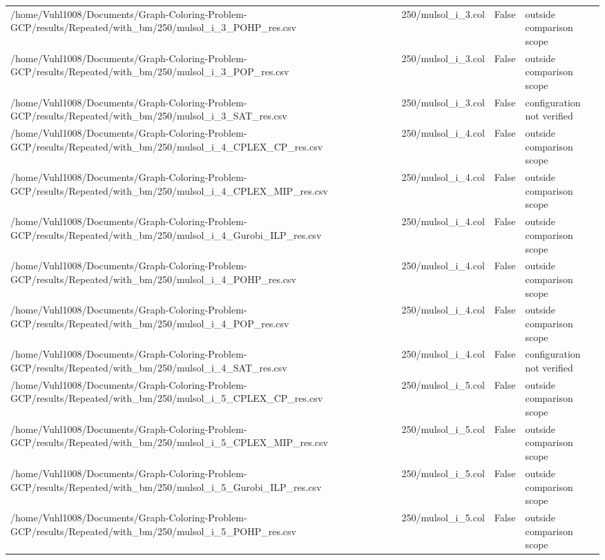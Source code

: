 \begin{table}[htbp]
\begin{tabular}{llll}
/home/Vuhl1008/Documents/Graph-Coloring-Problem-GCP/results/Repeated/with\_bm/250/mulsol\_i\_3\_POHP\_res.csv & 250/mulsol\_i\_3.col & False & outside comparison scope \\
/home/Vuhl1008/Documents/Graph-Coloring-Problem-GCP/results/Repeated/with\_bm/250/mulsol\_i\_3\_POP\_res.csv & 250/mulsol\_i\_3.col & False & outside comparison scope \\
/home/Vuhl1008/Documents/Graph-Coloring-Problem-GCP/results/Repeated/with\_bm/250/mulsol\_i\_3\_SAT\_res.csv & 250/mulsol\_i\_3.col & False & configuration not verified \\
/home/Vuhl1008/Documents/Graph-Coloring-Problem-GCP/results/Repeated/with\_bm/250/mulsol\_i\_4\_CPLEX\_CP\_res.csv & 250/mulsol\_i\_4.col & False & outside comparison scope \\
/home/Vuhl1008/Documents/Graph-Coloring-Problem-GCP/results/Repeated/with\_bm/250/mulsol\_i\_4\_CPLEX\_MIP\_res.csv & 250/mulsol\_i\_4.col & False & outside comparison scope \\
/home/Vuhl1008/Documents/Graph-Coloring-Problem-GCP/results/Repeated/with\_bm/250/mulsol\_i\_4\_Gurobi\_ILP\_res.csv & 250/mulsol\_i\_4.col & False & outside comparison scope \\
/home/Vuhl1008/Documents/Graph-Coloring-Problem-GCP/results/Repeated/with\_bm/250/mulsol\_i\_4\_POHP\_res.csv & 250/mulsol\_i\_4.col & False & outside comparison scope \\
/home/Vuhl1008/Documents/Graph-Coloring-Problem-GCP/results/Repeated/with\_bm/250/mulsol\_i\_4\_POP\_res.csv & 250/mulsol\_i\_4.col & False & outside comparison scope \\
/home/Vuhl1008/Documents/Graph-Coloring-Problem-GCP/results/Repeated/with\_bm/250/mulsol\_i\_4\_SAT\_res.csv & 250/mulsol\_i\_4.col & False & configuration not verified \\
/home/Vuhl1008/Documents/Graph-Coloring-Problem-GCP/results/Repeated/with\_bm/250/mulsol\_i\_5\_CPLEX\_CP\_res.csv & 250/mulsol\_i\_5.col & False & outside comparison scope \\
/home/Vuhl1008/Documents/Graph-Coloring-Problem-GCP/results/Repeated/with\_bm/250/mulsol\_i\_5\_CPLEX\_MIP\_res.csv & 250/mulsol\_i\_5.col & False & outside comparison scope \\
/home/Vuhl1008/Documents/Graph-Coloring-Problem-GCP/results/Repeated/with\_bm/250/mulsol\_i\_5\_Gurobi\_ILP\_res.csv & 250/mulsol\_i\_5.col & False & outside comparison scope \\
/home/Vuhl1008/Documents/Graph-Coloring-Problem-GCP/results/Repeated/with\_bm/250/mulsol\_i\_5\_POHP\_res.csv & 250/mulsol\_i\_5.col & False & outside comparison scope \\

\end{tabular}
\end{table}
